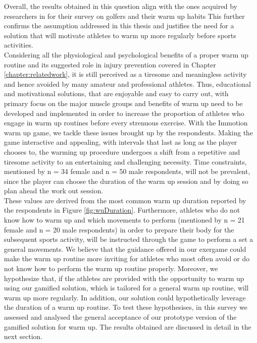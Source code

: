 Overall, the results obtained in this question align with the ones acquired by researchers in \cite{fradkin2010effects} for their survey on golfers and their warm up habits  This further confirms the assumption addressed in this thesis and justifies the need for a solution that will motivate athletes to warm up more regularly before sports activities. \\Considering all the physiological and psychological benefits of a proper warm up routine and its suggested role in injury prevention covered in Chapter \ref{chapter:relatedwork}, it is still perceived as a tiresome and meaningless activity and hence avoided by many amateur and professional athletes. Thus, educational and motivational solutions, that are enjoyable and easy to carry out, with primary focus on the major muscle groups and benefits of warm up need to be developed and implemented in order to increase the proportion of athletes who engage in warm up routines before every strenuous exercise. With the Immotion warm up game, we tackle these issues brought up by the respondents. Making the game interactive and appealing, with intervals that last as long as the player chooses to, the warming up procedure undergoes a shift from a repetitive and tiresome activity to an entertaining and challenging necessity. Time constraints, mentioned by n = 34 female and n = 50 male respondents, will not be prevalent, since the player can choose the duration of the warm up session and by doing so plan ahead the work out session.\\ These values are derived from the most common warm up duration reported by the respondents in Figure \ref{fig:wuDuration}. Furthermore, athletes who do not know how to warm up and which movements to perform (mentioned by n = 21 female and n = 20 male respondents) in order to prepare their body for the subsequent sports activity, will be instructed through the game to perform a set a general movements. We believe that the guidance offered in our exergame could make the warm up routine more inviting for athletes who most often avoid or do not know how to perform the warm up routine properly. Moreover, we hypothesize that, if the athletes are provided with the opportunity to warm up using our gamified solution, which is tailored for a general warm up routine, will warm up more regularly. In addition, our solution could hypothetically leverage the duration of a warm up routine. To test these hypothesises, in this survey we assessed and analysed the general acceptance of our prototype version of the gamified solution for warm up. The results obtained are discussed in detail in the next section. 
